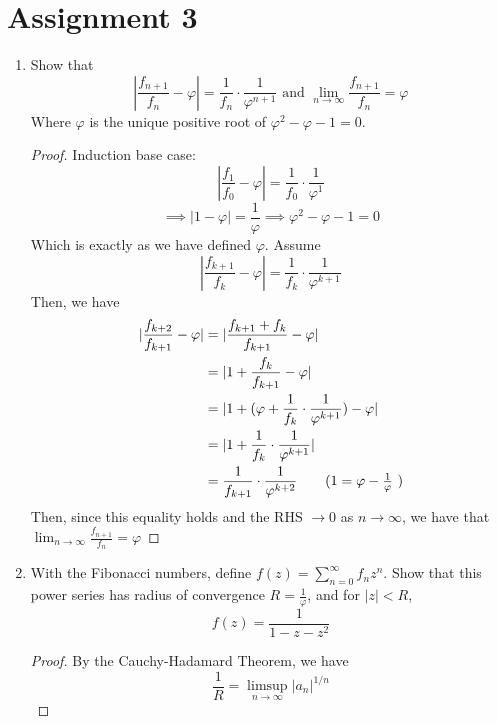 \documentclass[hidelinks,12pt]{article}
\title{\scalebox{1.5}{Math 723 Homework 3}}
\author{\scalebox{1.5}{Theo Koss}}
\date{September 2024}
\begin{document}
\maketitle
\section*{Assignment 3}
\begin{enumerate}
    \item Show that \[
            |\frac{f_{n+1}}{f_{n}}-\varphi|=\frac{1}{f_{n}}\cdot \frac{1}{\varphi^{n+1}}\text{ and } \lim_{n\to\infty}\frac{f_{n+1}}{f_{n}}=\varphi
    \] 
    Where \(\varphi\) is the unique positive root of \(\varphi^{2}-\varphi-1=0\).
    \begin{proof}
        Induction base case:
        \[
            |\frac{f_{1}}{f_{0}}-\varphi|=\frac{1}{f_{0}}\cdot \frac{1}{\varphi^{1}}
        \]
        \[
        \implies |1-\varphi|=\frac{1}{\varphi}\implies \varphi^{2}-\varphi-1=0
        \]
       Which is exactly as we have defined \(\varphi\). Assume
       \[
           |\frac{f_{k+1}}{f_{k}}-\varphi|=\frac{1}{f_{k}}\cdot \frac{1}{\varphi^{k+1}}
       \]
       Then, we have \begin{align*}
       |\frac{f_{k+2}}{f_{k+1}}-\varphi|&=|\frac{f_{k+1}+f_{k}}{f_{k+1}}-\varphi|\\
                                        &=|1+\frac{f_{k}}{f_{k+1}}-\varphi|\\
                                        &=|1+(\varphi+\frac{1}{f_{k}}\cdot \frac{1}{\varphi^{k+1}})-\varphi|\\
                                        &=|1+\frac{1}{f_{k}}\cdot \frac{1}{\varphi^{k+1}}|\\
                                        &=\frac{1}{f_{k+1}}\cdot \frac{1}{\varphi^{k+2}}\tag{\(1=\varphi-\frac{1}{\varphi}\) }\\
    \end{align*}
      Then, since this equality holds and the RHS \(\to0\) as \(n\to\infty\), we have that \(\lim_{n\to\infty}\frac{f_{n+1}}{f_{n}}=\varphi\)  
    \end{proof}
    \item With the Fibonacci numbers, define \(f(z)=\sum_{n=0}^{\infty}f_{n}z^{n}\). Show that this power series has radius of convergence \(R=\frac{1}{\varphi}\), and for \(|z|<R\), \[
            f(z)=\frac{1}{1-z-z^{2}}
    \]
   \begin{proof}
   By the Cauchy-Hadamard Theorem, we have \[
   \frac{1}{R}=\limsup_{n\to\infty}|a_{n}|^{1/n}
\]
\end{proof}
\end{enumerate}
\end{document}

